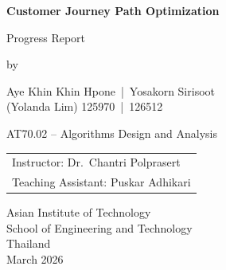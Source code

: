 \setcounter{page}{1}
\thispagestyle{empty}

\vspace*{\fill}

\begin{center}
    {\Large \bfseries Customer Journey Path Optimization}

    \vspace{2em}
    {\large Progress Report}

    \vspace{7em}

    by
    \begin{center}
        Aye Khin Khin Hpone \,|\, Yosakorn Sirisoot \\[0.5em]
        {\small (Yolanda Lim) 125970 \,|\, 126512}
    \end{center}

\vfill

    \begin{center}AT70.02 -- Algorithms Design and Analysis\end{center}

    \vspace{3em}

    \begin{tabular}{l}
        Instructor: Dr.\ Chantri Polprasert \\
        Teaching Assistant: Puskar Adhikari
    \end{tabular}

    \vspace{9em}

    Asian Institute of Technology\\
    School of Engineering and Technology\\
    Thailand\\
    March 2026
\end{center}

\vspace*{\fill}
